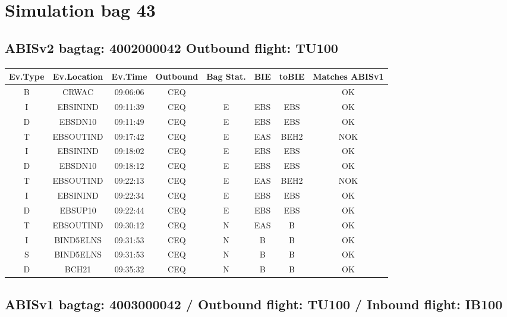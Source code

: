 \documentclass{report}
\begin{document}
\section*{Simulation bag 43}
\subsection*{ABISv2 bagtag: 4002000042 Outbound flight: TU100}
\paragraph{}
\begin{longtable}{cccccccc}    \toprule
\rowcolor{white!50}
\textbf{Ev.Type} & \textbf{Ev.Location} & \textbf{Ev.Time} & \textbf{Outbound} & \textbf{Bag Stat.} & \textbf{BIE} & \textbf{toBIE} & \textbf{Matches ABISv1} \\\midrule
B & CRWAC & 09:06:06  & CEQ &  &  &  & OK\\
I & EBSININD & 09:11:39  & CEQ & E & EBS & EBS & OK\\
D & EBSDN10 & 09:11:49  & CEQ & E & EBS & EBS & OK\\
T & EBSOUTIND & 09:17:42  & CEQ & E & EAS & BEH2 & NOK\\
I & EBSININD & 09:18:02  & CEQ & E & EBS & EBS & OK\\
D & EBSDN10 & 09:18:12  & CEQ & E & EBS & EBS & OK\\
T & EBSOUTIND & 09:22:13  & CEQ & E & EAS & BEH2 & NOK\\
I & EBSININD & 09:22:34  & CEQ & E & EBS & EBS & OK\\
D & EBSUP10 & 09:22:44  & CEQ & E & EBS & EBS & OK\\
T & EBSOUTIND & 09:30:12  & CEQ & N & EAS & B & OK\\
I & BIND5ELNS & 09:31:53  & CEQ & N & B & B & OK\\
S & BIND5ELNS & 09:31:53  & CEQ & N & B & B & OK\\
D & BCH21 & 09:35:32  & CEQ & N & B & B & OK\\
\bottomrule
\end{longtable}
\subsection*{ABISv1 bagtag: 4003000042 / Outbound flight: TU100 / Inbound flight: IB100}
\end{document}
